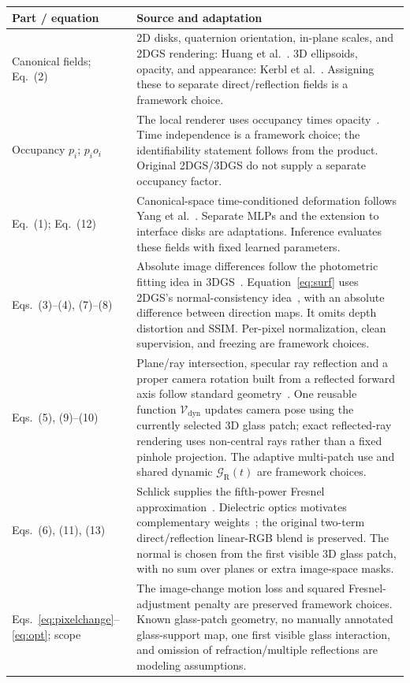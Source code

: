 \documentclass[10pt,a4paper]{article}
\newcommand{\GR}{\mathcal G_{\mathrm R}}
\newcommand{\Vf}{\mathcal V_{\mathrm{dyn}}}
\begin{document}
{\small
\begin{tabularx}{\textwidth}{@{}p{39mm}X@{}}
\toprule
\textbf{Part / equation} & \textbf{Source and adaptation}\\
\midrule
Canonical fields; Eq.~(2) & 2D disks, quaternion orientation, in-plane scales, and 2DGS rendering: Huang et al.~\cite{huang2024}. 3D ellipsoids, opacity, and appearance: Kerbl et al.~\cite{kerbl2023}. Assigning these to separate direct/reflection fields is a framework choice.\\
Occupancy $p_i$; $p_i o_i$ & The local renderer uses occupancy times opacity~\cite{vigor}. Time independence is a framework choice; the identifiability statement follows from the product. Original 2DGS/3DGS do not supply a separate occupancy factor.\\
Eq.~(1); Eq.~(12) & Canonical-space time-conditioned deformation follows Yang et al.~\cite{yang2024}. Separate MLPs and the extension to interface disks are adaptations. Inference evaluates these fields with fixed learned parameters.\\
Eqs.~(3)--(4), (7)--(8) & Absolute image differences follow the photometric fitting idea in 3DGS~\cite{kerbl2023}. Equation~\eqref{eq:surf} uses 2DGS's normal-consistency idea~\cite{huang2024}, with an absolute difference between direction maps. It omits depth distortion and SSIM. Per-pixel normalization, clean supervision, and freezing are framework choices.\\
Eqs.~(5), (9)--(10) & Plane/ray intersection, specular ray reflection and a proper camera rotation built from a reflected forward axis follow standard geometry~\cite{pbrt,reflector}. One reusable function $\Vf$ updates camera pose using the currently selected 3D glass patch; exact reflected-ray rendering uses non-central rays rather than a fixed pinhole projection. The adaptive multi-patch use and shared dynamic $\GR(t)$ are framework choices.\\
Eqs.~(6), (11), (13) & Schlick supplies the fifth-power Fresnel approximation~\cite{schlick1994}. Dielectric optics motivates complementary weights~\cite{pbrt}; the original two-term direct/reflection linear-RGB blend is preserved. The normal is chosen from the first visible 3D glass patch, with no sum over planes or extra image-space masks.\\
Eqs.~\eqref{eq:pixelchange}--\eqref{eq:opt}; scope & The image-change motion loss and squared Fresnel-adjustment penalty are preserved framework choices. Known glass-patch geometry, no manually annotated glass-support map, one first visible glass interaction, and omission of refraction/multiple reflections are modeling assumptions.\\
\bottomrule
\end{tabularx}}
\end{document}
